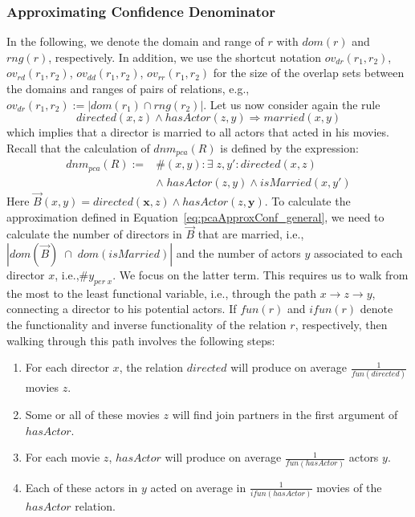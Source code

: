 \subsubsection{Approximating Confidence Denominator} \label{sec:appr}
In the following, we denote the domain and range of $r$ with $dom(r)$ and $rng(r)$, respectively.
In addition, we use the shortcut notation $ov_{dr}(r_1,r_2)$, $ov_{rd}(r_1,r_2)$, $ov_{dd}(r_1,r_2)$, $ov_{rr}(r_1,r_2)$
for the size of the overlap sets between the domains and ranges 
of pairs of relations, e.g., $ov_{dr}(r_1,r_2) := |dom(r_1) \cap rng(r_2)|$.
Let us now consider again the rule
\[
 directed(x,z) \wedge hasActor(z,y) \Rightarrow married(x,y)
\]
which implies that a director is married to all actors that acted in his movies.
Recall that the calculation of $dnm_{pca}(R)$ is defined by the expression:
\[
\begin{array}{rl}
dnm_{pca}(R) := &\#(x,y): \exists\; z, y': directed(x,z)  \\
  &\wedge\; hasActor(z,y) \wedge isMarried(x,y') \label{eq:denomPCAExample}
\end{array}
\]
Here $\vec{B}(x, y) = directed(\bm{x},z) \wedge hasActor(z,\bm{y})$.
To calculate the approximation defined in Equation~\ref{eq:pcaApproxConf_general}, 
we need to calculate the number of directors in $\vec{B}$ that are married, i.e.,  
$|dom(\vec{B})\;\cap\;dom(isMarried)|$ and the number of actors $y$ 
associated to each director $x$, i.e.,$\#y_{per\;x}$.
We focus on the latter term. 
This requires us to walk from the most to the least functional variable, i.e., through the path $x \rightarrow z \rightarrow y$, connecting a director to his potential actors. 
If $fun(r)$ and $ifun(r)$
denote the functionality and inverse functionality of the relation $r$, respectively, then
walking through this path involves the following steps:
\begin{enumerate} \itemsep +0.3ex
 \item For each director $x$, the relation $directed$ will produce on average $\frac{1}{fun(directed)}$ movies $z$.
 \item Some or all of these movies $z$ will find join partners in the first argument of $hasActor$.
 \item For each movie $z$, $hasActor$ will produce on average $\frac{1}{fun(hasActor)}$ actors $y$.
 \item Each of these actors in $y$ acted on average in  $\frac{1}{ifun(hasActor)}$ movies of the $hasActor$ relation.
\end{enumerate}

